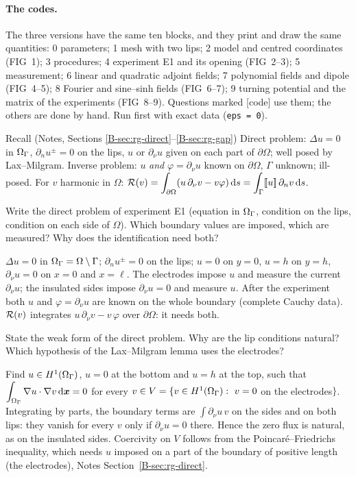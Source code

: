\paragraph{The codes.} The three versions have the same ten blocks, and they
print and draw the same quantities: 0 parameters; 1 mesh with two lips;
2 model and centred coordinates (FIG~1); 3 procedures; 4 experiment E1 and
its opening (FIG~2--3); 5 measurement; 6 linear and quadratic adjoint
fields; 7 polynomial fields and dipole (FIG~4--5); 8 Fourier and
sine--sinh fields (FIG~6--7); 9 turning potential and the matrix of the
experiments (FIG~8--9). Questions marked \textcolor{cu}{[code]} use them;
the others are done by hand. Run first with exact data (\texttt{eps = 0}).

\begin{gbox}{Recall (Notes, Sections \ref{B-sec:rg-direct}--\ref{B-sec:rg-gap})}
Direct problem: $\Delta u=0$ in $\Omega_\Gamma$, $\partial_nu^\pm=0$ on the lips, $u$ or
$\partial_\nu u$ given on each part of $\partial\Omega$; well posed by
Lax--Milgram. Inverse problem: $u$ \emph{and} $\varphi=\partial_\nu u$ known
on $\partial\Omega$, $\Gamma$ unknown; ill-posed. For $v$ harmonic in $\Omega$:
$\displaystyle \mathcal{R}(v)=\int_{\partial\Omega}(u\,\partial_\nu v-v\varphi)\,\mathrm{d} s=\int_\Gamma[\![u]\!]\,\partial_nv\,\mathrm{d} s$.
\end{gbox}

\q Write the direct problem of experiment E1 (equation in $\Omega_\Gamma$, condition on
the lips, condition on each side of $\Omega$). Which boundary values are
imposed, which are measured? Why does the identification need both?
\begin{answer}
$\Delta u=0$ in $\Omega_\Gamma=\Omega\setminus\Gamma$; $\partial_nu^\pm=0$ on the lips;
$u=0$ on $y=0$, $u=h$ on $y=h$, $\partial_\nu u=0$ on $x=0$ and $x=\ell$.
The electrodes impose $u$ and measure the current $\partial_\nu u$; the
insulated sides impose $\partial_\nu u=0$ and measure $u$. After the
experiment both $u$ and $\varphi=\partial_\nu u$ are known on the whole
boundary (complete Cauchy data). $\mathcal{R}(v)$ integrates
$u\,\partial_\nu v-v\,\varphi$ over $\partial\Omega$: it needs both.
\end{answer}

\q State the weak form of the direct problem. Why are the lip conditions
natural? Which hypothesis of the Lax--Milgram lemma uses the electrodes?
\begin{answer}
Find $u\in H^1(\Omega_\Gamma)$, $u=0$ at the bottom and $u=h$ at the top, such that
$\displaystyle \int_{\Omega_\Gamma}\nabla u\cdot\nabla v\,\mathrm{d}\bm{x}=0$ for every $v\in V=\{v\in
H^1(\Omega_\Gamma):\ v=0$ on the electrodes$\}$. Integrating by parts, the boundary
terms are $\displaystyle \int\partial_\nu u\,v$ on the sides and on both lips:
they vanish for every $v$ only if $\partial_\nu u=0$ there. Hence the zero
flux is natural, as on the insulated sides. Coercivity on $V$ follows from
the Poincar\'e--Friedrichs inequality, which needs $u$ imposed on a part
of the boundary of positive length (the electrodes), Notes
Section~\ref{B-sec:rg-direct}.
\end{answer}

